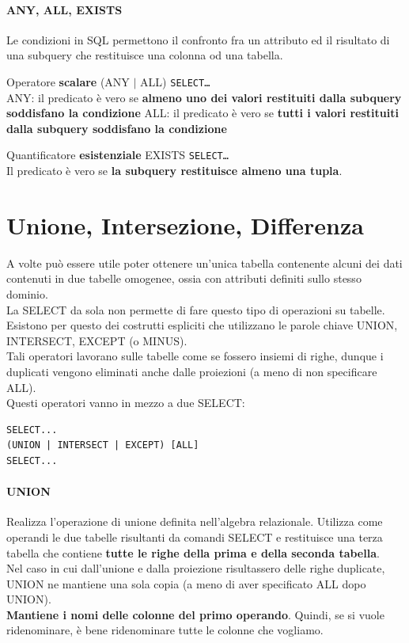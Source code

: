 \documentclass[10pt]{book}
\begin{document}
\paragraph{ANY, ALL, EXISTS} Le condizioni in SQL permettono il confronto fra un attributo ed il risultato di una subquery che restituisce una colonna od una tabella.
\begin{list}{}{}
	\item Operatore \textbf{scalare} (ANY $|$ ALL) \texttt{SELECT\ldots}\\
	ANY: il predicato è vero se \textbf{almeno uno dei valori restituiti dalla subquery soddisfano la condizione}
	ALL: il predicato è vero se \textbf{tutti i valori restituiti dalla subquery soddisfano la condizione}
	\item Quantificatore \textbf{esistenziale} EXISTS \texttt{SELECT\ldots}\\
	Il predicato è vero se \textbf{la subquery restituisce almeno una tupla}.
\end{list}
\section{Unione, Intersezione, Differenza}
A volte può essere utile poter ottenere un'unica tabella contenente alcuni dei dati contenuti in due tabelle omogenee, ossia con attributi definiti sullo stesso dominio.\\
La SELECT da sola non permette di fare questo tipo di operazioni su tabelle. Esistono per questo dei costrutti espliciti che utilizzano le parole chiave UNION, INTERSECT, EXCEPT (o MINUS).\\
Tali operatori lavorano sulle tabelle come se fossero insiemi di righe, dunque i duplicati vengono eliminati anche dalle proiezioni (a meno di non specificare ALL).\\
Questi operatori vanno in mezzo a due SELECT:
\begin{lstlisting}
SELECT...
(UNION | INTERSECT | EXCEPT) [ALL]
SELECT...
\end{lstlisting}
\paragraph{UNION} Realizza l'operazione di unione definita nell'algebra relazionale. Utilizza come operandi le due tabelle risultanti da comandi SELECT e restituisce una terza tabella che contiene \textbf{tutte le righe della prima e della seconda tabella}.\\
Nel caso in cui dall'unione e dalla proiezione risultassero delle righe duplicate, UNION ne mantiene una sola copia (a meno di aver specificato ALL dopo UNION).\\
\textbf{Mantiene i nomi delle colonne del primo operando}. Quindi, se si vuole ridenominare, è bene ridenominare tutte le colonne che vogliamo.
\end{document}
